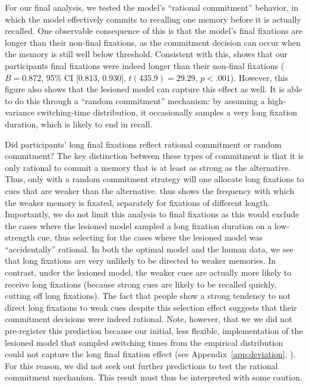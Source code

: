 For our final analysis, we tested the model's ``rational commitment'' behavior, in which the model effectively commits to recalling one memory before it is actually recalled. One observable consequence of this is that the model's final fixations are longer than their non-final fixations, as the commitment decision can occur when the memory is still well below threshold. Consistent with this,  shows that our participants final fixations were indeed longer than their non-final fixations ($B = 0.872$, 95\% CI [0.813, 0.930], $t(435.9)=29.29$, $p < .001$). However, this figure also shows that the lesioned model can capture this effect as well. It is able to do this through a ``random commitment'' mechanism: by assuming a high-variance switching-time distribution, it occasionally samples a very long fixation duration, which is likely to end in recall. 

Did participants' long final fixations reflect rational commitment or random commitment? The key distinction between these types of commitment is that it is only rational to commit a memory that is at least as strong as the alternative. Thus, only with a random commitment strategy will one allocate long fixations to cues that are weaker than the alternative.  thus shows the frequency with which the weaker memory is fixated, separately for fixations of different length. Importantly, we do not limit this analysis to final fixations as this would exclude the cases where the lesioned model sampled a long fixation duration on a low-strength cue, thus selecting for the cases where the lesioned model was ``accidentally'' rational. In both the optimal model and the human data, we see that long fixations are very unlikely to be directed to weaker memories. In contrast, under the lesioned model, the weaker cues are actually more likely to receive long fixations (because strong cues are likely to be recalled quickly, cutting off long fixations). The fact that people show a strong tendency to not direct long fixations to weak cues despite this selection effect suggests that their commitment decisions were indeed rational. Note, however, that we we did not pre-register this prediction because our initial, less flexible, implementation of the lesioned model that sampled switching times from the empirical distribution could not capture the long final fixation effect (see Appendix~\ref{app:deviation}, ). For this reason, we did not seek out further predictions to test the rational commitment mechanism. This result must thus be interpreted with some caution.

